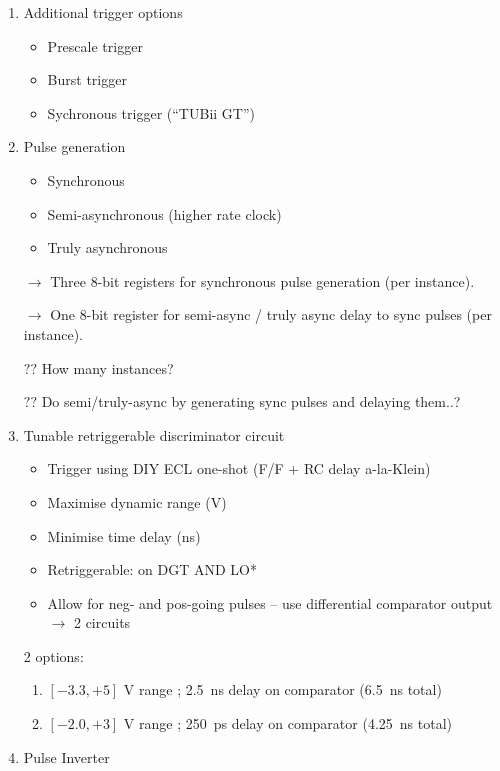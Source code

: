\documentclass[letter, 11pt]{article}
\begin{document}
\begin{enumerate}
\item Additional trigger options

\begin{itemize}
\item Prescale trigger
\item Burst trigger
\item Sychronous trigger (``TUBii GT'')
\end{itemize}

\item Pulse generation

\begin{itemize}
\item Synchronous
\item Semi-asynchronous (higher rate clock)
\item Truly asynchronous
\end{itemize}

$\rightarrow$ Three 8-bit registers for synchronous pulse generation (per instance).

$\rightarrow$ One 8-bit register for semi-async / truly async delay to sync pulses (per instance).

$??$ How many instances?

$??$ Do semi/truly-async by generating sync pulses and delaying them..?

\item Tunable retriggerable discriminator circuit

\begin{itemize}
\item Trigger using DIY ECL one-shot (F/F + RC delay a-la-Klein)
\item Maximise dynamic range (V)
\item Minimise time delay (ns)
\item Retriggerable: on DGT AND LO*
\item Allow for neg- and pos-going pulses -- use differential comparator output $\rightarrow$ 2 circuits
\end{itemize}

2 options:
\begin{enumerate}
\item $[-3.3, +5]$ V range ; 2.5~ns delay on comparator (6.5~ns total)
\item $[-2.0, +3]$ V range ; 250~ps delay on comparator (4.25~ns total)
\end{enumerate}



\item Pulse Inverter


\end{enumerate}
\end{document}

